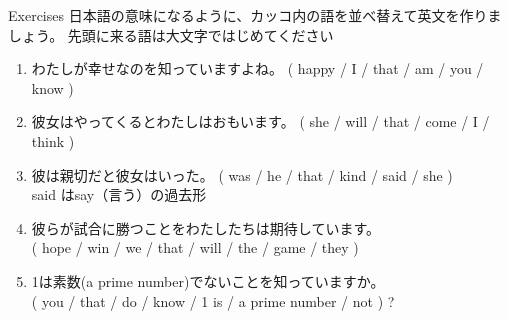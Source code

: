 \documentclass[aspectratio=169,xcolor={dvipsnames,table}]{beamer}
\begin{document}
\begin{frame}[plain]{Exercises}\small
日本語の意味になるように、カッコ内の語を並べ替えて英文を作りましょう。
先頭に来る語は大文字ではじめてください%
\mbox{}\hfill{\scriptsize {}}


\vspace{-5pt}

\begin{enumerate}
 \item わたしが幸せなのを知っていますよね。
( happy / I / that / am / you / know )\\
 \item 彼女はやってくるとわたしはおもいます。
( she / will / that / come / I / think )\\
 \item 彼は親切だと彼女はいった。
( was / he / that / kind / said / she )\\
%
\hfill{\scriptsize said  はsay（言う）の過去形}
 \item 彼らが試合に勝つことをわたしたちは期待しています。\\
( hope / win / we / that / will / the / game / they )\\
 \item 1は素数({\scriptsize a prime number})でないことを知っていますか。\\
( you / that / do / know / 1 is / a prime number / not  ) ?\\
\end{enumerate}
\end{frame}
\end{document}
